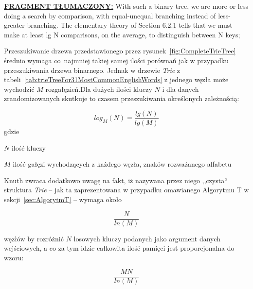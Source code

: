 	\ifsourcematerial	
	\begin{displayquote}
		\color{ao(english)}
		\underline{\textbf{FRAGMENT TŁUMACZONY:}} \newline
		With such a binary tree, we are more or less doing a search by comparison,
		with equal-unequal branching instead of less-greater branching. The elementary
		theory of Section 6.2.1 tells that we must make at least lg N comparisons, on the
		average, to distinguish between N keys; 
	\end{displayquote}
	\fi
	
	Przeszukiwanie drzewa przedstawionego przez rysunek~\ref{fig:CompleteTrieTree} średnio wymaga co~najmniej takiej samej ilości porównań jak w przypadku przeszukiwania drzewa binarnego. Jednak w drzewie \emph{Trie} z tabeli~\ref{tab:trieTreeFor31MostCommonEnglishWords} z jednego węzła może wychodzić $M$ rozgałęzień.\newline Dla dużych ilości kluczy $N$ i dla danych zrandomizowanych skutkuje to czasem przeszukiwania określonych zależnością:
	
	\begin{equation}
	log_M(N) = \frac{lg(N)}{lg(M)}
	\end{equation}
	gdzie
	\begin{eqwhere}[2cm]
		\item[$N$] ilość kluczy
		\item[$M$] ilość gałęzi wychodzących z każdego węzła, znaków rozważanego alfabetu 
	\end{eqwhere}
	
	Knuth zwraca dodatkowo uwagę na fakt, iż nazywana przez niego ,,czysta`` struktura \emph{Trie} -- jak ta zaprezentowana w przypadku omawianego Algorytmu T w sekcji~\ref{sec:AlgorytmT} -- wymaga około
	
	\begin{equation}
	\frac{N}{ln(M)}
	\end{equation}
	
	węzłów by rozróżnić $N$ losowych kluczy podanych jako argument danych wejściowych, a co za tym idzie całkowita ilość pamięci jest proporcjonalna do wzoru:
	
	\begin{equation}
	\frac{MN}{ln(M)}
	\end{equation}
	
